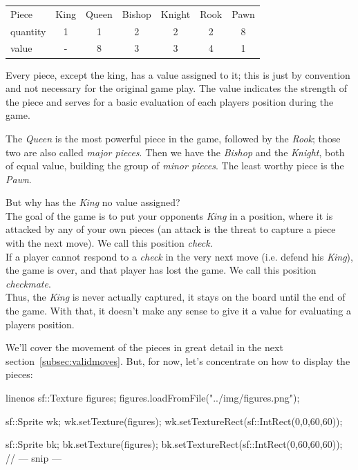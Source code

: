 \begin{center}
\begin{tabular}{l | c | c | c | c | c | c}
  \hline
  Piece & King & Queen & Bishop & Knight & Rook & Pawn \\
  quantity & 1 & 1 & 2 & 2 & 2 & 8 \\
  value  & - & 8 & 3 & 3 & 4 & 1 \\
  \hline
\end{tabular}
\end{center}

Every piece, except the king, has a value assigned to it; this is just by convention and
not necessary for the original game play.
The value indicates the strength of the piece and serves for a basic evaluation of each players
position during the game.

The \emph{Queen} is the most powerful piece in the game, followed by the \emph{Rook};
those two are also called \emph{major pieces}.
Then we have the \emph{Bishop} and the \emph{Knight}, both of equal value, building the
group of \emph{minor pieces}.
The least worthy piece is the \emph{Pawn}.

But why has the \emph{King} no value assigned?\\
The goal of the game is to put your opponents \emph{King} in a position, where it is attacked
by any of your own pieces (an attack is the threat to capture a piece with the next move).
We call this position \emph{check}.\\
If a player cannot respond to a \emph{check} in the very next move (i.e. defend his \emph{King}),
the game is over, and that player has lost the game.
We call this position \emph{checkmate}.\\
Thus, the \emph{King} is never actually captured, it stays on the board until the end of the game.
With that, it doesn't make any sense to give it a value for evaluating a players position. 

We'll cover the movement of the pieces in great detail in the next section~\ref{subsec:validmoves}.
But, for now, let's concentrate on how to display the pieces:

\begin{cpp*}{linenos}
  sf::Texture figures;
  figures.loadFromFile("../img/figures.png");

  sf::Sprite wk;
  wk.setTexture(figures);
  wk.setTextureRect(sf::IntRect(0,0,60,60));

  sf::Sprite bk;
  bk.setTexture(figures);
  bk.setTextureRect(sf::IntRect(0,60,60,60));
  // --- snip ---
\end{cpp*}

